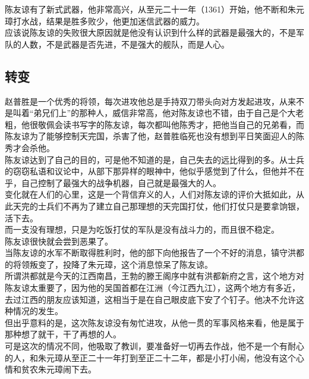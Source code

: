 \begin{multicols}{\theparacolNo}
陈友谅有了新式武器，他非常高兴，从至元二十一年（1361）开始，他不断和朱元璋打水战，结果是胜多败少，他更加迷信武器的威力。\\

应该说陈友谅的失败很大原因就是他没有认识到什么样的武器是最强大的，不是军队的人数，不是武器是否先进，不是强大的舰队，而是人心。\\

\subsection{转变}
赵普胜是一个优秀的将领，每次进攻他总是手持双刀带头向对方发起进攻，从来不是叫着“弟兄们上”的那种人，威信非常高，他对陈友谅也不错，由于自己是个大老粗，他很敬佩会读书写字的陈友谅，每次都叫他陈秀才，把他当自己的兄弟看，而陈友谅为了能够控制天完国，杀害了他，赵普胜临死也没有想到平日笑面迎人的陈秀才会杀他。\\

陈友谅达到了自己的目的，可是他不知道的是，自己失去的远比得到的多。从士兵的窃窃私语和议论中，从部下那异样的眼神中，他似乎感觉到了什么，但他并不在乎，自己控制了最强大的战争机器，自己就是最强大的人。\\

变化就在人们的心里，这是一个背信弃义的人，人们对陈友谅的评价大抵如此，从此天完的士兵们不再为了建立自己那理想的天完国打仗，他们打仗只是要拿饷银，活下去。\\

而一支没有理想，只是为吃饭打仗的军队是没有战斗力的，而且很不稳定。\\

陈友谅很快就会尝到恶果了。\\

当陈友谅的水军不断取得胜利时，他的部下向他报告了一个不好的消息，镇守洪都的将领叛变了，投降了朱元璋，这个消息惊呆了陈友谅。\\

所谓洪都就是今天的江西南昌，王勃的滕王阁序中就有洪都新府之言，这个地方对陈友谅太重要了，因为他的吴国首都在江洲（今江西九江），这两个地方有多近，去过江西的朋友应该知道，这相当于是在自己眼皮底下安了个钉子。他决不允许这种情况的发生。\\

但出乎意料的是，这次陈友谅没有匆忙进攻，从他一贯的军事风格来看，他是属于那种想了就干，干了再想的人。\\

可是这次的情况不同，他吸取了教训，要准备好一切再去作战，他不是一个有耐心的人，和朱元璋从至正二十一年打到至正二十二年，都是小打小闹，他没有这个心情和贫农朱元璋闹下去。\\


\end{multicols}
